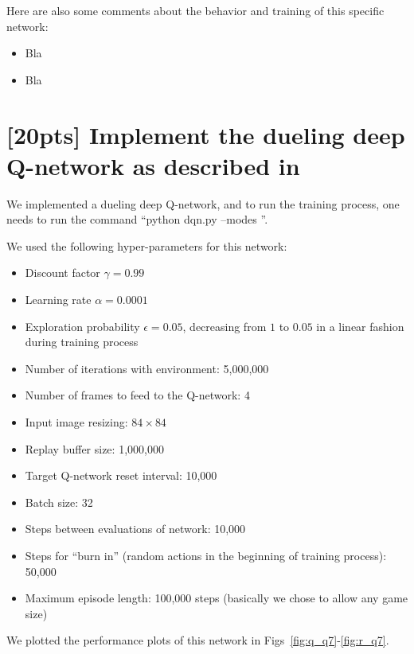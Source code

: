 \documentclass{article}
\begin{document}
Here are also some comments about the behavior and training of this specific network:

\begin{itemize}
  \item Bla
  \item Bla
\end{itemize}

\section{[20pts] Implement the dueling deep Q-network as described in \cite{wang2015dueling}}

We implemented a dueling deep Q-network, and to run the training process, one needs to run the command ``python dqn.py --modes ''.

We used the following hyper-parameters for this network:
\begin{itemize}
  \item Discount factor $\gamma=0.99$
  \item Learning rate $\alpha=0.0001$
  \item Exploration probability $\epsilon=0.05$, decreasing from $1$ to $0.05$ in a linear fashion during training process
  \item Number of iterations with environment: 5,000,000
  \item Number of frames to feed to the Q-network: 4
  \item Input image resizing: $84\times84$
  \item Replay buffer size: 1,000,000
  \item Target Q-network reset interval: 10,000
  \item Batch size: 32
  \item Steps between evaluations of network: 10,000
  \item Steps for ``burn in'' (random actions in the beginning of training process): 50,000
  \item Maximum episode length: 100,000 steps (basically we chose to allow any game size)
\end{itemize}

We plotted the performance plots of this network in Figs~\ref{fig:q_q7}-\ref{fig:r_q7}.

\end{document}
